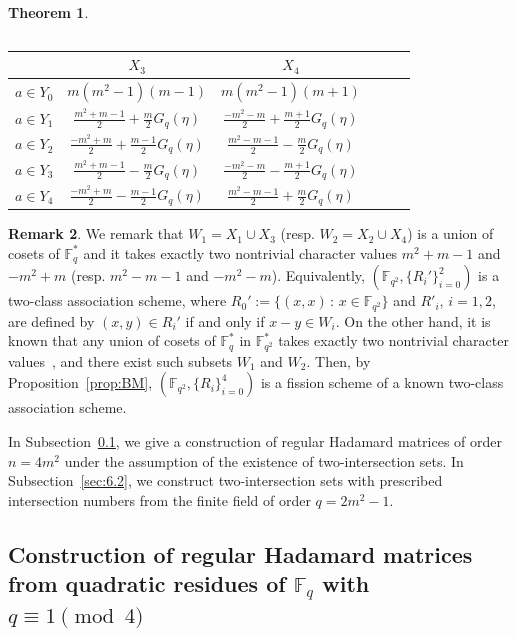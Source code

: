 \documentclass[10pt]{amsart}
\newtheorem{theo}{Theorem}[section]
\theoremstyle{definition}
\newtheorem{rema}[theo]{Remark}
\newcommand*\F{{\mathbb F}}
\begin{document}
\begin{theo}
\begin{table}[!h]
\begin{center}
\begin{tabular}{|c||c|c|c|c|c|}
\end{tabular}\vspace{0.5em}
\begin{tabular}{|c||c|c|c|c|c|}\hline
&$X_3$&$X_4$\\ \hline \hline $a\in Y_0$& $m(m^2-1)(m-1)$ & $m(m^2-1)(m+1)$\\\hline $a\in Y_{1}$& $\frac{m^2+m-1}{2}+\frac{m}{2}G_q(\eta)$ & $\frac{-m^2-m}{2}+\frac{m+1}{2}G_q(\eta)$\\\hline $a\in Y_2$& $\frac{-m^2+m}{2}+\frac{m-1}{2}G_q(\eta)$& $\frac{m^2-m-1}{2}-\frac{m}{2}G_q(\eta)$\\\hline $a\in Y_{3}$& $\frac{m^2+m-1}{2}-\frac{m}{2}G_q(\eta)$ & $\frac{-m^2-m}{2}-\frac{m+1}{2}G_q(\eta)$\\\hline $a\in Y_4$& $\frac{-m^2+m}{2}-\frac{m-1}{2}G_q(\eta)$ & $\frac{m^2-m-1}{2}+\frac{m}{2}G_q(\eta)$\\\hline
\end{tabular}
\end{center}
\end{table}
\end{theo}

\begin{rema}
We remark that $W_1=X_1\cup X_3$ (resp. $W_2=X_2\cup X_4$) is a union of cosets of $\F_{q}^\ast$ and it takes exactly two nontrivial character values $m^2+m-1$ and $-m^2+m$ (resp. $m^2-m-1$ and $-m^2-m$). Equivalently, $(\F_{q^2},\{R_i'\}_{i=0}^2)$ is a two-class association scheme, where $R_0':=\{(x,x)\,:\,x\in \F_{q^2}\}$ and $R'_i$, $i=1,2$, are defined by $(x,y)\in R_{i}'$ if and only if $x-y\in W_i$. On the other hand, it is known that any union of cosets of $\F_{q}^\ast$ in $\F_{q^2}^\ast$ takes exactly two nontrivial character values~\cite[Theorem~2]{BWX}, and there exist such subsets $W_1$ and $W_2$. Then, by Proposition~\ref{prop:BM}, $(\F_{q^2},\{R_i\}_{i=0}^4)$ is a fission scheme of a known two-class association scheme.
\end{rema}

In Subsection~\ref{sec:6.1}, we give a construction of regular Hadamard matrices of order $n=4m^2$ under the assumption of the existence of two-intersection sets. In Subsection~\ref{sec:6.2}, we construct two-intersection sets with prescribed intersection numbers from the finite field of order $q=2m^2-1$.

\subsection{Construction of regular Hadamard matrices from quadratic residues of \texorpdfstring{$\F_q$}{Fq} with \texorpdfstring{$q\equiv 1\pmod{4}$}{q = 1 (mod 4)}}\label{sec:6.1}
\end{document}
